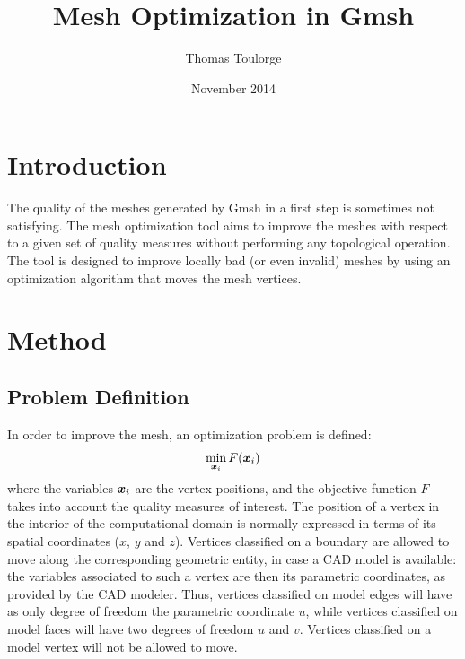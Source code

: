 \documentclass[12pt,a4paper,a4wide]{article}
\title{Mesh Optimization in Gmsh}
\author{Thomas Toulorge}
\date{November 2014}
\renewcommand{\vec}[1]{\ensuremath{\text{\boldmath $#1$\unboldmath}}}
\newcommand{\mvx}{\vec{x}}
\begin{document}





\maketitle


\section{Introduction}

The quality of the meshes generated by Gmsh in a first step is
sometimes not satisfying. The mesh optimization tool aims to
improve the meshes with respect to a given set of quality measures
without performing any topological operation. The tool is designed
to improve locally bad (or even invalid) meshes by using an
optimization algorithm that moves the mesh vertices.


\section{Method}


\subsection{Problem Definition}\label{sec:problem-def}

In order to improve the mesh, an optimization problem is defined:
\[
\min_{\mvx_i} F(\mvx_i)
\]
where the variables $\mvx_i$ are the vertex positions, and the objective
function $F$ takes into account the quality measures of interest. The
position of a vertex in the interior of the computational domain
is normally expressed in terms of its spatial coordinates ($x$, $y$ and
$z$). Vertices classified on a boundary are allowed to move along the
corresponding geometric entity, in case a CAD model is available:
the variables associated to such a vertex are then its parametric
coordinates, as provided by the CAD modeler. Thus, vertices
classified on model edges will have as only degree of freedom the
parametric coordinate $u$, while vertices classified on model faces
will have two degrees of freedom $u$ and $v$. Vertices classified on
a model vertex will not be allowed to move.
\end{document}
